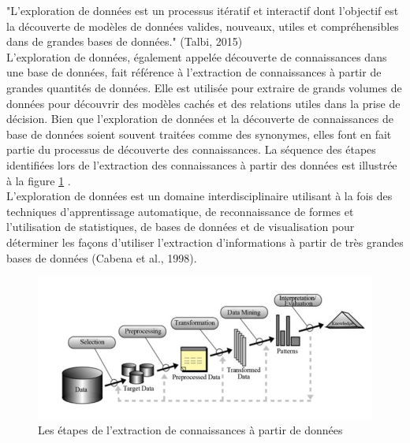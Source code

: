     "L'exploration de données est un processus itératif et interactif dont l'objectif est la découverte de modèles de données valides,
    nouveaux, utiles et compréhensibles dans de grandes bases de données." (Talbi, 2015) \\
    L'exploration de données, également appelée découverte de connaissances dans une base de données,
    fait référence à l'extraction de connaissances à partir de grandes quantités de données. Elle est
    utilisée pour extraire de grands volumes de données pour découvrir des modèles cachés et des 
    relations utiles dans la prise de décision. Bien que l'exploration de données et la découverte 
    de connaissances de base de données soient souvent traitées comme des synonymes, elles font en 
    fait partie du processus de découverte des connaissances. La séquence des étapes identifiées lors
    de l'extraction des connaissances à partir des données est illustrée à la figure \ref{extraction_connaissances} \cite{data_mining_concepts_techniques}.  \\
    L'exploration de données est un domaine interdisciplinaire utilisant à la fois des techniques 
    d'apprentissage automatique, de reconnaissance de formes et l'utilisation de statistiques, de bases de 
    données et de visualisation pour déterminer les façons d'utiliser l'extraction d'informations à partir de 
    très grandes bases de données (Cabena et al., 1998).

    \begin{figure}[H]
		\begin{center}
			\includegraphics{images/chapitre1/Les étapes de l'extraction de connaissances à partir de données}
		\end{center}
    \caption{Les étapes de l'extraction de connaissances à partir de données}
    \label{extraction_connaissances}
    \end{figure}
    
